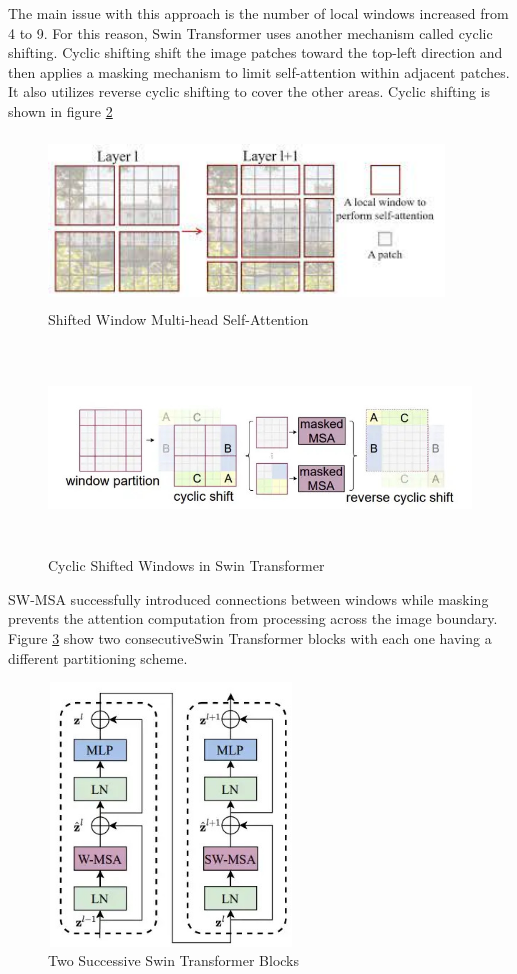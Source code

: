The main issue with this approach is the number of local windows increased from 4 to 9. For this reason, Swin Transformer uses another mechanism called cyclic shifting. Cyclic shifting shift the image patches toward the top-left direction and then applies a masking mechanism to limit self-attention within adjacent patches. It also utilizes reverse cyclic shifting to cover the other areas. Cyclic shifting is shown in figure \ref{fig:swin cyclic}
\begin{figure}[ht]
\includegraphics[width=10.5cm, height=4.5cm]{images/swin-msa1.jpeg}
\centering
\caption{Shifted Window Multi-head Self-Attention}
\label{fig:swin shifted}
\end{figure}

\begin{figure}[ht]
\includegraphics[width=13.5cm, height=5.5cm]{images/swin-cyclic-shift.jpg}
\centering
\caption{Cyclic Shifted Windows in Swin Transformer}
\label{fig:swin cyclic}
\end{figure}

SW-MSA successfully introduced connections between windows while masking prevents the attention computation from processing across the image boundary. Figure \ref{fig:2swins} show two consecutiveSwin Transformer blocks with each one having a different partitioning scheme.
\FloatBarrier
\begin{figure}[ht]
\includegraphics[width=6.5cm, height=7cm]{images/swin-architecture.jpg}
\centering
\caption{Two Successive Swin Transformer Blocks}
\label{fig:2swins}
\end{figure}

